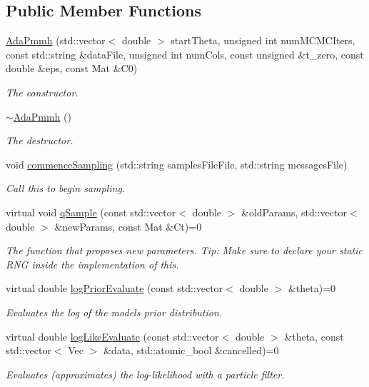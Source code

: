 \subsection*{Public Member Functions}
\begin{DoxyCompactItemize}
\item 
\hyperlink{classAdaPmmh_a247d3febff7dec788e4cc15039fcfa54}{Ada\+Pmmh} (std\+::vector$<$ double $>$ start\+Theta, unsigned int num\+M\+C\+M\+C\+Iters, const std\+::string \&data\+File, unsigned int num\+Cols, const unsigned \&t\+\_\+zero, const double \&eps, const Mat \&C0)
\begin{DoxyCompactList}\small\item\em The constructor. \end{DoxyCompactList}\item 
\hyperlink{classAdaPmmh_a9442ce68b296f98fd4bc6e36133057c9}{$\sim$\+Ada\+Pmmh} ()\hypertarget{classAdaPmmh_a9442ce68b296f98fd4bc6e36133057c9}{}\label{classAdaPmmh_a9442ce68b296f98fd4bc6e36133057c9}

\begin{DoxyCompactList}\small\item\em The destructor. \end{DoxyCompactList}\item 
void \hyperlink{classAdaPmmh_ab21f3892ad24a401b4a1e0614189196d}{commence\+Sampling} (std\+::string samples\+File\+File, std\+::string messages\+File)
\begin{DoxyCompactList}\small\item\em Call this to begin sampling. \end{DoxyCompactList}\item 
virtual void \hyperlink{classAdaPmmh_a81671891053303ff63138a75f7017482}{q\+Sample} (const std\+::vector$<$ double $>$ \&old\+Params, std\+::vector$<$ double $>$ \&new\+Params, const Mat \&Ct)=0
\begin{DoxyCompactList}\small\item\em The function that proposes new parameters. Tip\+: Make sure to declare your static R\+NG inside the implementation of this. \end{DoxyCompactList}\item 
virtual double \hyperlink{classAdaPmmh_aa404dfc89421ac020316b34bc19de7da}{log\+Prior\+Evaluate} (const std\+::vector$<$ double $>$ \&theta)=0
\begin{DoxyCompactList}\small\item\em Evaluates the log of the model\textquotesingle{}s prior distribution. \end{DoxyCompactList}\item 
virtual double \hyperlink{classAdaPmmh_a74b93e24341c204c65dc49fe5950aa13}{log\+Like\+Evaluate} (const std\+::vector$<$ double $>$ \&theta, const std\+::vector$<$ Vec $>$ \&data, std\+::atomic\+\_\+bool \&cancelled)=0
\begin{DoxyCompactList}\small\item\em Evaluates (approximates) the log-\/likelihood with a particle filter. \end{DoxyCompactList}\end{DoxyCompactItemize}
